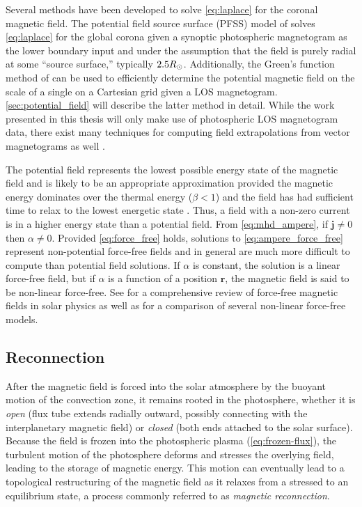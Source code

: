 Several methods have been developed to solve \autoref{eq:laplace} for the coronal magnetic field. The potential field source surface (PFSS) model of \citet{schatten_model_1969} solves \autoref{eq:laplace} for the global corona given a synoptic photospheric magnetogram as the lower boundary input and under the assumption that the field is purely radial at some ``source surface,'' typically $2.5R_{\odot}$. Additionally, the Green's function method of \citet{schmidt_observable_1964} can be used to efficiently determine the potential magnetic field on the scale of a single \AR{} on a Cartesian grid given a LOS magnetogram. \autoref{sec:potential_field} will describe the latter method in detail. While the work presented in this thesis will only make use of photospheric LOS magnetogram data, there exist many techniques for computing field extrapolations from vector magnetograms as well \citep[see review by][]{welsch_deriving_2016}.

The potential field represents the lowest possible energy state of the magnetic field and is likely to be an appropriate approximation provided the magnetic energy dominates over the thermal energy ($\beta<1$) and the field has had sufficient time to relax to the lowest energetic state \citep{priest_magnetohydrodynamics_2014}. Thus, a field with a non-zero current is in a higher energy state than a potential field. From \autoref{eq:mhd_ampere}, if $\mathbf{j}\neq0$ then $\alpha\neq0$. Provided \autoref{eq:force_free} holds, solutions to \autoref{eq:ampere_force_free} represent non-potential force-free fields and in general are much more difficult to compute than potential field solutions. If $\alpha$ is constant, the solution is a linear force-free field, but if $\alpha$ is a function of a position $\mathbf{r}$, the magnetic field is said to be non-linear force-free. See \citet{wiegelmann_solar_2012} for a comprehensive review of force-free magnetic fields in solar physics as well as \citet{schrijver_nonlinear_2008} for a comparison of several non-linear force-free models.

\subsection{Reconnection}\label{sec:reconnection}

After the magnetic field is forced into the solar atmosphere by the buoyant motion of the convection zone, it remains rooted in the photosphere, whether it is \textit{open} (flux tube extends radially outward, possibly connecting with the interplanetary magnetic field) or \textit{closed} (both ends attached to the solar surface). Because the field is frozen into the photospheric plasma (\autoref{eq:frozen-flux}), the turbulent motion of the photosphere deforms and stresses the overlying field, leading to the storage of magnetic energy. This motion can eventually lead to a topological restructuring of the magnetic field as it relaxes from a stressed to an equilibrium state, a process commonly referred to as \textit{magnetic reconnection}.


